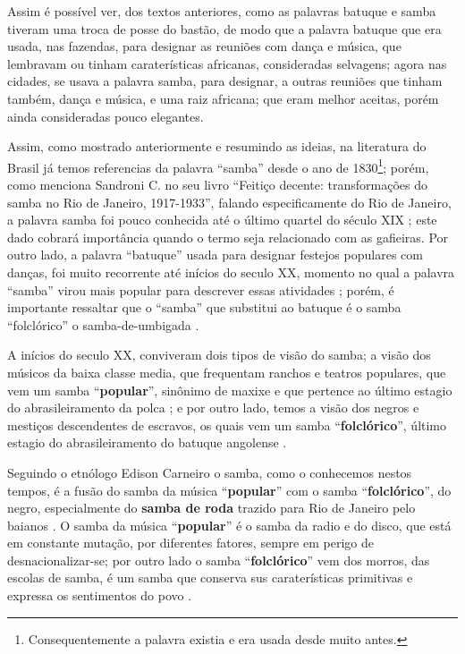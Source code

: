 Assim é possível ver, dos textos anteriores, como as palavras batuque e samba 
tiveram uma troca de posse do bastão,
de modo que a palavra batuque que era usada, nas fazendas, 
para designar as reuniões com dança e música,
que lembravam ou tinham caraterísticas africanas, consideradas selvagens;
agora nas cidades, se usava a palavra samba, para designar,
a outras reuniões que tinham também, dança e música, 
e uma raiz africana; que eram melhor aceitas, porém ainda consideradas pouco elegantes. 





Assim, como mostrado anteriormente e resumindo as ideias, 
na literatura do Brasil já temos referencias da palavra ``samba'' desde o ano de 1830\footnote{
Consequentemente a palavra existia e era usada desde muito antes.}; 
porém, como menciona Sandroni C. no seu livro ``Feitiço decente: transformações do samba no Rio de Janeiro, 1917-1933'', 
falando especificamente do Rio de Janeiro, 
a palavra samba foi pouco conhecida até o último quartel do século XIX \cite[pp. 86]{sandroni2001feitico};
este dado cobrará importância quando o termo seja relacionado com as gafieiras.
Por outro lado, a palavra  ``batuque'' usada para designar festejos populares com danças, 
foi muito recorrente até inícios do seculo XX, 
momento no qual a palavra ``samba'' virou mais popular para descrever essas atividades \cite[pp. 85]{sandroni2001feitico} \cite[pp. 47]{diniz2008almanaque}; porém,
é importante ressaltar que o ``samba'' que substitui ao batuque 
é o samba ``folclórico'' o samba-de-umbigada  \cite[pp. 96]{sandroni2001feitico}.

A inícios do seculo XX, 
conviveram dois tipos de visão do samba;
a visão dos músicos da baixa classe media, que frequentam ranchos e teatros populares, 
que vem um samba ``\textbf{popular}'', 
sinônimo de maxixe e que pertence ao último estagio 
do abrasileiramento da polca  \cite[pp. 139]{sandroni2001feitico}; e
por outro lado, temos a visão dos negros e mestiços descendentes de escravos,
os quais vem um samba ``\textbf{folclórico}'', 
último estagio do abrasileiramento do batuque angolense \cite[pp. 139]{sandroni2001feitico}.

Seguindo o etnólogo Edison Carneiro o samba, como o conhecemos nestos tempos,
é a fusão do samba da música ``\textbf{popular}'' com o samba  ``\textbf{folclórico}'', 
do negro, especialmente do \textbf{samba de roda} trazido para Rio de Janeiro pelo baianos \cite[pp. 21]{jornalsambaderoda1}.
O samba da música ``\textbf{popular}'' é o samba da radio e do disco, que está em constante mutação,
por diferentes fatores, sempre em perigo de desnacionalizar-se; por outro lado o samba   ``\textbf{folclórico}''
vem dos morros, das escolas de samba, é um samba que conserva sus caraterísticas primitivas e
 expressa os sentimentos do povo \cite[pp. 21]{jornalsambaderoda1}.


